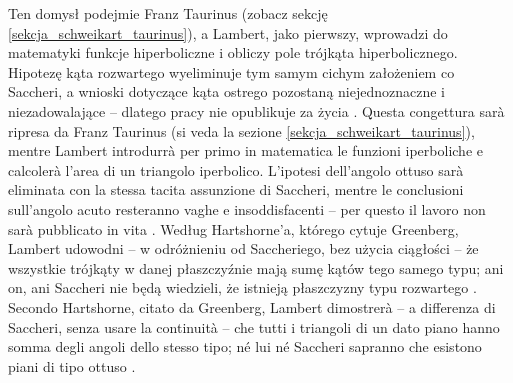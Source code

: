 Ten domysł podejmie Franz Taurinus (zobacz sekcję \ref{sekcja_schweikart_taurinus}), a Lambert, jako pierwszy, wprowadzi do matematyki funkcje hiperboliczne i obliczy pole trójkąta hiperbolicznego. %
Hipotezę kąta rozwartego wyeliminuje tym samym cichym założeniem co Saccheri, a wnioski dotyczące kąta ostrego pozostaną niejednoznaczne i niezadowalające -- dlatego pracy nie opublikuje za życia \cite[s. 286]{eves1_1972}. %
Questa congettura sarà ripresa da Franz Taurinus (si veda la sezione \ref{sekcja_schweikart_taurinus}), mentre Lambert introdurrà per primo in matematica le funzioni iperboliche e calcolerà l'area di un triangolo iperbolico. %
L'ipotesi dell'angolo ottuso sarà eliminata con la stessa tacita assunzione di Saccheri, mentre le conclusioni sull'angolo acuto resteranno vaghe e insoddisfacenti -- per questo il lavoro non sarà pubblicato in vita \cite[p. 286]{eves1_1972}. %
Według Hartshorne'a, którego cytuje Greenberg, Lambert udowodni -- w odróżnieniu od Saccheriego, bez użycia ciągłości -- że wszystkie trójkąty w danej płaszczyźnie mają sumę kątów tego samego typu; ani on, ani Saccheri nie będą wiedzieli, że istnieją płaszczyzny typu rozwartego \cite[s. 208--209]{greenberg_2010}. %
Secondo Hartshorne, citato da Greenberg, Lambert dimostrerà -- a differenza di Saccheri, senza usare la continuità -- che tutti i triangoli di un dato piano hanno somma degli angoli dello stesso tipo; né lui né Saccheri sapranno che esistono piani di tipo ottuso \cite[p. 208--209]{greenberg_2010}. %
